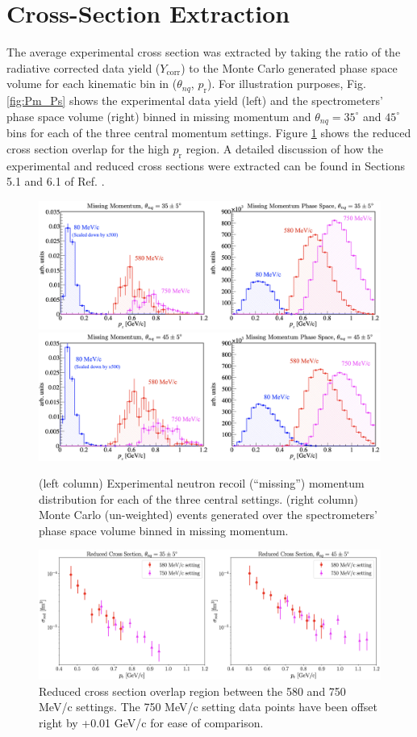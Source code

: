 \documentclass[aps, prl]{revtex4-2}  %
\begin{document}
\section{\large Cross-Section Extraction}
\indent The average experimental cross section was extracted by taking the ratio of the radiative corrected data yield ($Y_{\mathrm{corr}}$) to the Monte Carlo generated phase space volume for each
kinematic bin in ($\theta_{nq}$, $p_{\mathrm{r}}$). For illustration purposes, Fig. \ref{fig:Pm_Ps} shows the experimental data yield (left) and the spectrometers' phase space volume (right) binned in
missing momentum and $\theta_{nq} = 35^{\circ}$ and  $45^{\circ}$ bins for each of the three central momentum settings. Figure \ref{fig:RedXsec_overlap} shows the reduced cross section overlap for the high
$p_{\mathrm{r}}$ region. A detailed discussion of how the experimental and reduced cross sections were extracted can be
found in Sections 5.1 and 6.1 of Ref. \cite{cyero_phdthesis}.
\begin{figure}[!h]
\includegraphics[scale=0.30]{Pr_and_Ps_35deg.png}
\includegraphics[scale=0.30]{Pr_and_Ps_45deg.png}
\caption{(left column) Experimental neutron recoil (``missing'') momentum distribution for each of the three central settings. (right column) Monte Carlo (un-weighted) events generated over
  the spectrometers' phase space volume binned in missing momentum.}
\label{fig:Pm_Ps}
\includegraphics[scale=0.30]{RedXsec_overlap.png}
\caption{Reduced cross section overlap region between the 580 and 750 MeV/c settings. The 750 MeV/c setting data points have been offset right by +0.01 GeV/c for ease of comparison.}
\label{fig:RedXsec_overlap}
\end{figure}
\end{document}
